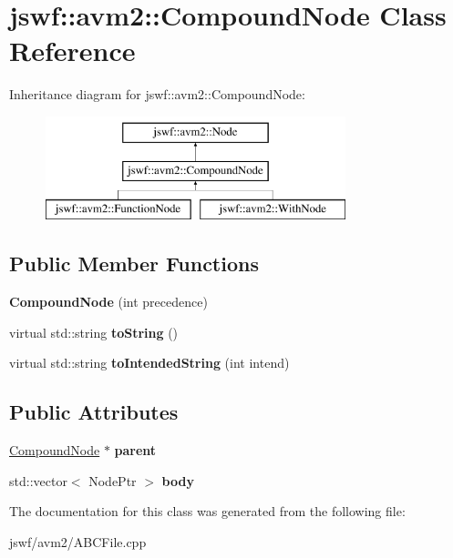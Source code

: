 \hypertarget{classjswf_1_1avm2_1_1_compound_node}{\section{jswf\+:\+:avm2\+:\+:Compound\+Node Class Reference}
\label{classjswf_1_1avm2_1_1_compound_node}
}
Inheritance diagram for jswf\+:\+:avm2\+:\+:Compound\+Node\+:\begin{figure}[H]
\begin{center}
\leavevmode
\includegraphics[height=3.000000cm]{classjswf_1_1avm2_1_1_compound_node}
\end{center}
\end{figure}
\subsection*{Public Member Functions}
\begin{DoxyCompactItemize}
\item 
\hypertarget{classjswf_1_1avm2_1_1_compound_node_ac500442d0107e1661541ad42f6e2d8e8}{{\bfseries Compound\+Node} (int precedence)}\label{classjswf_1_1avm2_1_1_compound_node_ac500442d0107e1661541ad42f6e2d8e8}

\item 
\hypertarget{classjswf_1_1avm2_1_1_compound_node_a8cf83396ec696c4e8653859fe20e88f2}{virtual std\+::string {\bfseries to\+String} ()}\label{classjswf_1_1avm2_1_1_compound_node_a8cf83396ec696c4e8653859fe20e88f2}

\item 
\hypertarget{classjswf_1_1avm2_1_1_compound_node_a87a730eef3ef3c81518707d8cf6864cd}{virtual std\+::string {\bfseries to\+Intended\+String} (int intend)}\label{classjswf_1_1avm2_1_1_compound_node_a87a730eef3ef3c81518707d8cf6864cd}

\end{DoxyCompactItemize}
\subsection*{Public Attributes}
\begin{DoxyCompactItemize}
\item 
\hypertarget{classjswf_1_1avm2_1_1_compound_node_af092e67ba306a70bd573d93d7f6deee1}{\hyperlink{classjswf_1_1avm2_1_1_compound_node}{Compound\+Node} $\ast$ {\bfseries parent}}\label{classjswf_1_1avm2_1_1_compound_node_af092e67ba306a70bd573d93d7f6deee1}

\item 
\hypertarget{classjswf_1_1avm2_1_1_compound_node_a6c8beda626abc0bdb59966a2996b7da2}{std\+::vector$<$ Node\+Ptr $>$ {\bfseries body}}\label{classjswf_1_1avm2_1_1_compound_node_a6c8beda626abc0bdb59966a2996b7da2}

\end{DoxyCompactItemize}


The documentation for this class was generated from the following file\+:\begin{DoxyCompactItemize}
\item 
jswf/avm2/A\+B\+C\+File.\+cpp\end{DoxyCompactItemize}
